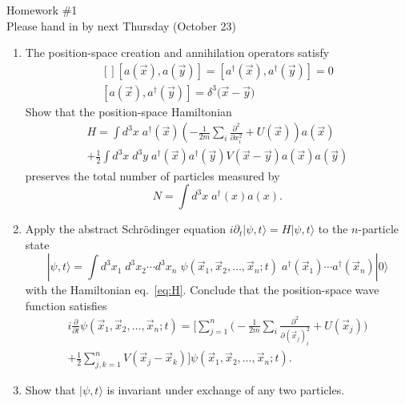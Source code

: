 \documentclass[12pt]{article}
\begin{document}
\begin{center}
  {\Huge Homework \#1}
  \\[1pt]
  Please hand in by next Thursday (October 23)
\end{center}
\vspace{1cm}

\begin{enumerate}
\item 
  The position-space creation and annihilation operators satisfy 
  \begin{equation}
    \begin{gathered}[]
      [a(\vec{x}), a(\vec{y})] = 
      [a^\dagger(\vec{x}), a^\dagger(\vec{y})] = 0
      \\[1pt]
      [a(\vec{x}), a^\dagger(\vec{y})] =
      \delta^3\big(\vec{x}-\vec{y}\big)      
    \end{gathered}
  \end{equation}
  Show that the position-space Hamiltonian 
  \begin{multline}
    \label{eq:H}
    H = \int d^3x \; 
    a^\dagger(\vec{x}) 
    \left( 
      -\frac{1}{2m} \sum_i \frac{\partial^2}{\partial x_i^2}
      + U(\vec{x})
    \right)
    a(\vec{x})
    \\
    + \frac{1}{2} \int d^3x \; d^3y \;
    a^\dagger(\vec{x}) a^\dagger(\vec{y}) V(\vec{x}-\vec{y})
    a(\vec{x}) a(\vec{y})
  \end{multline}
  preserves the total number of particles measured by
  \begin{equation}
    N = \int d^3x \; a^\dagger(x) a(x).
  \end{equation}
\item Apply the abstract Schr\"odinger equation $i\partial_t
  |\psi,t\rangle=H|\psi,t\rangle$ to the $n$-particle state
  \begin{equation}
    |\psi, t\rangle = 
    \int d^3x_1 \; d^3x_2 \cdots d^3 x_n \;
    \psi(\vec{x}_1, \vec{x}_2, \dots, \vec{x}_n; t) \;
    a^\dagger(\vec{x}_1)\cdots a^\dagger(\vec{x}_n)
    |0\rangle
  \end{equation}
  with the Hamiltonian eq.~\eqref{eq:H}. Conclude that the
  position-space wave function satisfies
  \begin{multline}
    i \frac{\partial}{\partial t} \psi(\vec{x}_1, \vec{x}_2, \dots, \vec{x}_n; t) =
    \bigg[
      \sum_{j=1}^n \Big(
        -\frac{1}{2m} \sum_i \frac{\partial^2}{\partial (\vec{x}_j)_i^2}
        + U(\vec{x}_j)
      \Big)
      \\
      + \frac{1}{2} \sum_{j, k=1}^n
      V(\vec{x}_j - \vec{x}_k)
    \bigg]
    \psi(\vec{x}_1, \vec{x}_2, \dots, \vec{x}_n; t).
  \end{multline}
\item Show that $|\psi,t\rangle$ is invariant under exchange of any
  two particles.
\end{enumerate}
\end{document}
